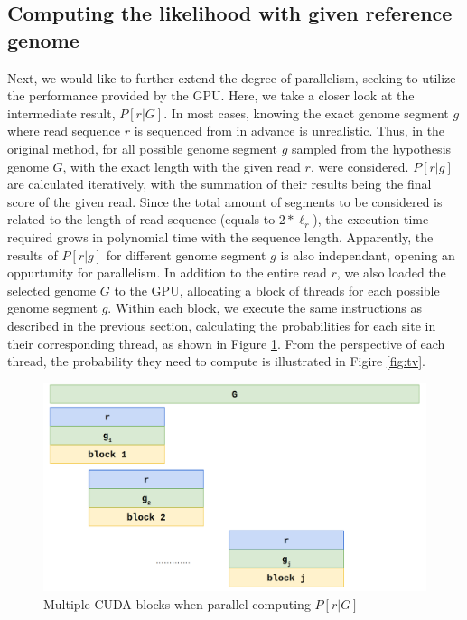 \documentclass{PHlab-thesis}
\begin{document}
\subsection{Computing the likelihood with given reference genome}
Next, we would like to further extend the degree of parallelism, seeking to utilize the performance provided by the GPU. Here, we take a closer look at the intermediate result, $P[r|G]$. In most cases, knowing the exact genome segment $g$ where read sequence $r$ is sequenced from in advance is unrealistic. Thus, in the original method, for all possible genome segment $g$ sampled from the hypothesis genome $G$, with the exact length with the given read $r$, were considered. $P[r|g]$ are calculated iteratively, with the summation of their results being the final score of the given read. Since the total amount of segments to be considered is related to the length of read sequence (equals to $2*{\ell_r}$), the execution time required grows in polynomial time with the sequence length. Apparently, the results of $P[r|g]$ for different genome segment $g$ is also independant, opening an oppurtunity for parallelism. In addition to the entire read $r$, we also loaded the selected genome $G$ to the GPU, allocating a block of threads for each possible genome segment $g$. Within each block, we execute the same instructions as described in the previous section, calculating the probabilities for each site in their corresponding thread, as shown in Figure \ref{fig:prG}. From the perspective of each thread, the probability they need to compute is illustrated in Figire \ref{fig:tv}.
\begin{figure}
	\centering
	\includegraphics[scale=0.3]{figures/prG.png}
	\caption{Multiple CUDA blocks when parallel computing $P[r|G]$}
	\label{fig:prG} %
\end{figure}
\end{document}

